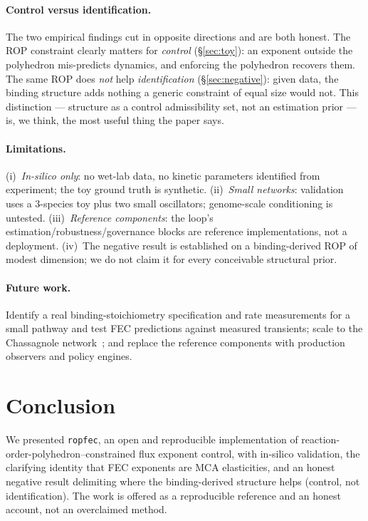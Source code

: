 \documentclass[11pt]{article}
\begin{document}
\paragraph{Control versus identification.} The two empirical findings cut in
opposite directions and are both honest. The ROP constraint clearly matters for
\emph{control} (\S\ref{sec:toy}): an exponent outside the polyhedron mis-predicts
dynamics, and enforcing the polyhedron recovers them. The same ROP does
\emph{not} help \emph{identification} (\S\ref{sec:negative}): given data, the
binding structure adds nothing a generic constraint of equal size would not. This
distinction --- structure as a control admissibility set, not an estimation prior
--- is, we think, the most useful thing the paper says.

\paragraph{Limitations.} (i)~\emph{In-silico only}: no wet-lab data, no kinetic
parameters identified from experiment; the toy ground truth is synthetic.
(ii)~\emph{Small networks}: validation uses a $3$-species toy plus two small
oscillators; genome-scale conditioning is untested. (iii)~\emph{Reference
components}: the loop's estimation/robustness/governance blocks are reference
implementations, not a deployment. (iv)~The negative result is established on a
binding-derived ROP of modest dimension; we do not claim it for every conceivable
structural prior.

\paragraph{Future work.} Identify a real binding-stoichiometry specification and
rate measurements for a small pathway and test FEC predictions against measured
transients; scale to the Chassagnole network~\citep{chassagnole2002}; and replace
the reference components with production observers and policy engines.

\section{Conclusion}

We presented \texttt{ropfec}, an open and reproducible implementation of
reaction-order-polyhedron--constrained flux exponent control, with in-silico
validation, the clarifying identity that FEC exponents are MCA elasticities, and
an honest negative result delimiting where the binding-derived structure helps
(control, not identification). The work is offered as a reproducible reference and
an honest account, not an overclaimed method.
\end{document}
